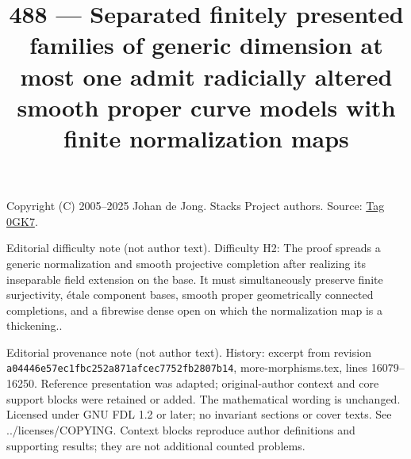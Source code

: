 \documentclass{amsart}
\theoremstyle{plain}
\theoremstyle{definition}
\theoremstyle{remark}
\numberwithin{equation}{subsection}
\begin{document}
\title[Stacks Project, Tag 0GK7]{488 --- Separated finitely presented families of generic dimension at most one admit radicially altered smooth proper curve models with finite normalization maps}
\maketitle
\noindent Copyright (C) 2005--2025 Johan de Jong. Stacks Project authors. Source: \href{https://stacks.math.columbia.edu/tag/0GK7}{Tag 0GK7}.

\noindent Editorial difficulty note (not author text). Difficulty H2: The proof spreads a generic normalization and smooth projective completion after realizing its inseparable field extension on the base. It must simultaneously preserve finite surjectivity, étale component bases, smooth proper geometrically connected completions, and a fibrewise dense open on which the normalization map is a thickening..

\noindent Editorial provenance note (not author text). History: excerpt from revision \texttt{a0444\allowbreak 6e57e\allowbreak c1fbc\allowbreak 252a8\allowbreak 71afc\allowbreak ec775\allowbreak 2fb28\allowbreak 07b14}, more-morphisms.tex, lines 16079--16250. Reference presentation was adapted; original-author context and core support blocks were retained or added. The mathematical wording is unchanged. Licensed under GNU FDL 1.2 or later; no invariant sections or cover texts. See ../licenses/COPYING. Context blocks reproduce author definitions and supporting results; they are not additional counted problems.
\end{document}
